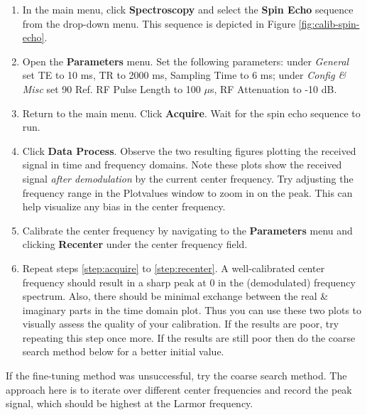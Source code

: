 \begin{enumerate}
    \item In the main menu, click \textbf{Spectroscopy} and select the \textbf{Spin Echo} sequence from the drop-down menu. This sequence is depicted in Figure \ref{fig:calib-spin-echo}.
    \item \label{step:params} Open the \textbf{Parameters} menu. Set the following parameters: under \emph{General} set TE to 10 ms, TR to 2000 ms, Sampling Time to 6 ms; under \emph{Config \& Misc} set 90 Ref. RF Pulse Length to 100 $\mu$s, RF Attenuation to -10 dB.
    \item \label{step:acquire} Return to the main menu. Click \textbf{Acquire}. Wait for the spin echo sequence to run.
    \item \label{step:process} Click \textbf{Data Process}. Observe the two resulting figures plotting the received signal in time and frequency domains. Note these plots show the received signal \emph{after demodulation} by the current center frequency. Try adjusting the frequency range in the Plotvalues window to zoom in on the peak. This can help visualize any bias in the center frequency.
    \item \label{step:recenter} Calibrate the center frequency by navigating to the \textbf{Parameters} menu and clicking \textbf{Recenter} under the center frequency field. %
    \item Repeat steps \ref{step:acquire} to \ref{step:recenter}. A well-calibrated center frequency should result in a sharp peak at 0 in the (demodulated) frequency spectrum. Also, there should be minimal exchange between the real \& imaginary parts in the time domain plot. Thus you can use these two plots to visually assess the quality of your calibration. If the results are poor, try repeating this step once more. If the results are still poor then do the coarse search method below for a better initial value.
\end{enumerate}

If the fine-tuning method was unsuccessful, try the coarse search method. The approach here is to iterate over different center frequencies and record the peak signal, which should be highest at the Larmor frequency.

